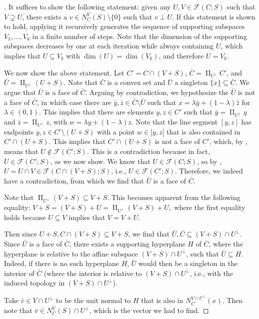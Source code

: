 \documentclass[10pt,a4paper]{amsart}
\DeclareMathOperator{\proj}{\Pi}
\begin{document}
\begin{proof}[\hypertarget{loc:completeness_of_the_composition_of_nested_normals.proof}Proof of \Cref{loc:completeness_of_the_composition_of_nested_normals.statement}]

It suffices to show the following statement: given any $U,V \in \mathcal{F}(C;S)$ such that $V \supsetneq U$,
there exists a $v \in N_C^V(S) \setminus \{0\}$ such that $v \perp U$. 
If this statement is shown to hold, applying it recursively generates the sequence of supporting subspaces $V_1, \ldots, V_k$ in a finite number of steps. 
Note that the dimension of the supporting subspaces decreases by one at each iteration while always containing $U$, which implies that $U \subseteq V_k$ with $\dim(U)=\dim(V_k)$, and therefore $U=V_k.$

We now show the above statement.
Let $C' = C \cap (V + S)$, $\bar{C} = \proj_{U^\perp} C'$, and $\bar{U} =  \proj_{U^\perp} (U + S)$.
Note that $\bar{C}$ is a convex set and $\bar{U}$
a singleton $\{x\} \subseteq \bar{C}$.  We argue that $\bar{U}$ is a face of $\bar{C}$.
Arguing by contradiction, we hypothesize the $\bar{U}$ is not a face of $\bar{C}$, in which case there are $\bar{y}, \bar{z} \in \bar{C}\setminus \bar{U}$
such that $x = \lambda\bar{y} + (1-\lambda)\bar{z}$ for $\lambda \in (0, 1)$. This implies that there are elements $y, z \in C'$ such that $\bar{y}= \proj_{U^\perp}y$ 
and $\bar{z}= \proj_{U^\perp}z$, with $w =  \lambda y+(1-\lambda)z$. Note that the line segment $[y,z]$ has endpoints $y, z \in C' \setminus (U+S)$ with a point $w  \in ]y,z[$  that is also contained in $C' \cap (U+S)$. This implies that $C' \cap (U+S)$ is not a face of $C'$, which, by , means that
$U \notin \mathcal{F}(C';S)$. This is a contradiction because in fact, $U  \in \mathcal{F}(C';S)$, as we now show. We know that $U  \in \mathcal{F}(C;S)$, so by
, $U = U \cap V \in \mathcal{F}(C \cap (V+ S);S)$, i.e., $U \in \mathcal{F}(C';S)$.
Therefore, we indeed have a contradiction, from which we find that $\bar{U}$ is a face of $\bar{C}$.

Note that $\proj_{U^\perp}(V + S) \subseteq V + S$. This becomes
apparent from the following equality:
$V + S = (V + S) + U = \proj_{U^\perp} (V + S) + U,$
where the first equality holds because $U \subseteq V$ implies that $V = V + U$. 

Then since $U+S, C \cap (V +S ) \subseteq V + S$, we find that $\bar{U}, \bar{C} \subseteq (V+S) \cap U^\perp$.
Since $\bar{U}$ is a face of $\bar{C}$, 
there exists a supporting hyperplane $H$ of $\bar{C}$, where
the hyperplane is relative to the affine subspace $(V+S) \cap U^\perp$, such that
$\bar{U} \subseteq H$.
Indeed, if there is no such hyperplane $H$, $\bar{U}$ would then be a singleton
in the interior of $\bar{C}$ (where the interior is relative to $(V+S)\cap U^\perp$, i.e., with the
induced topology in $(V+S)\cap U^\perp$).

Take $\bar{v} \in V \cap U^\perp$ to be the unit
normal to $H$ that is also in $N_{\bar{C}}^{V \cap U^\perp}(x)$. 
Then note that $\bar{v} \in N_C^{V}(S) \cap U^\perp$, which is the vector
we had to find.
\end{proof}
\end{document}
